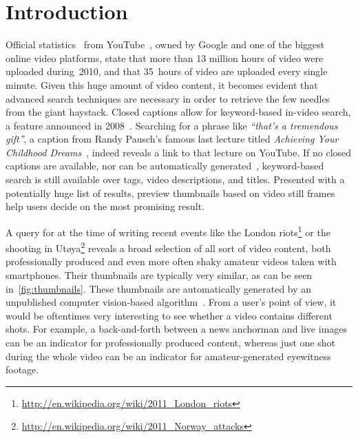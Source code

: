 \documentclass[runningheads,a4paper]{llncs}
\begin{document}
\section{Introduction}
Official statistics~\cite{youtube:stats} from YouTube~\cite{youtube}, owned by Google and one of the biggest online video platforms, state that more than 13 million hours of video were uploaded during~2010, and that 35~hours of video are uploaded every single minute. Given this huge amount of video content, it becomes evident that advanced search techniques are necessary in order to retrieve the few needles from the giant haystack. Closed captions allow for keyword-based in-video search, a feature announced in 2008~\cite{googlevideo}. Searching for a phrase like \emph{``that's a tremendous gift''}, a caption from Randy Pausch's famous last lecture titled \emph{Achieving Your Childhood Dreams}~\cite{pausch}, indeed reveals a link to that lecture on YouTube. If no closed captions are available, nor can be automatically generated~\cite{youtubecaptions}, keyword-based search is still available over tags, video descriptions, and titles. Presented with a potentially huge list of results, preview thumbnails based on video still frames help users decide on the most promising result.

A query for at the time of writing recent events like the London riots\footnote{\url{http://en.wikipedia.org/wiki/2011_London_riots}} or the shooting in Ut\o ya\footnote{\url{http://en.wikipedia.org/wiki/2011_Norway_attacks}} reveals a broad selection of all sort of video content, both professionally produced and even more often shaky amateur videos taken with smartphones. Their thumbnails are typically very similar, as can be seen in~\autoref{fig:thumbnails}. These thumbnails are automatically generated by an unpublished computer vision-based algorithm~\cite{googleresearch}. From a user's point of view, it would be oftentimes very interesting to see whether a video contains different shots. For example, a back-and-forth between a news anchorman and live images can be an indicator for professionally  produced content, whereas just one shot during the whole video can be an indicator for amateur-generated eyewitness footage.
\end{document}
